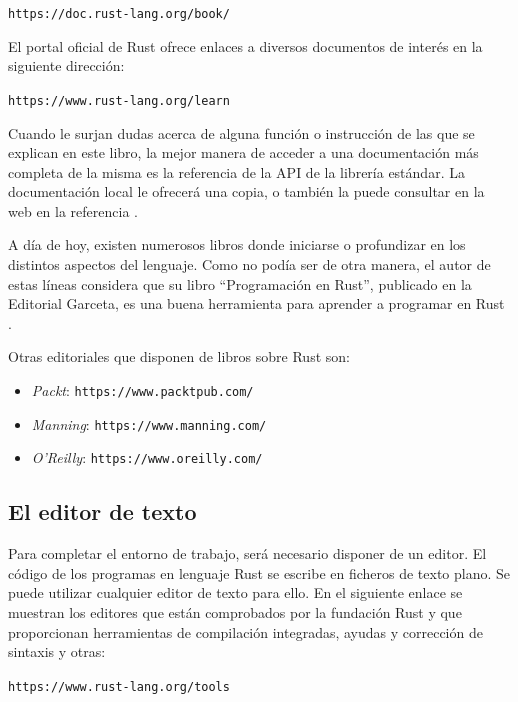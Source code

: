 {\centering \small \texttt{https://doc.rust-lang.org/book/} \par}

El portal oficial de Rust ofrece enlaces a diversos documentos de interés en la siguiente dirección:

{\centering \small \texttt{https://www.rust-lang.org/learn} \par}

Cuando le surjan dudas acerca de alguna función o instrucción de las que se explican en este libro, la mejor manera de acceder a una documentación más completa de la misma es la referencia de la API de la librería estándar. La documentación local le ofrecerá una copia, o también la puede 
consultar en la web en la referencia \citep{rustfoundationRustStandardLibrary}.

A día de hoy, existen numerosos libros donde iniciarse o profundizar en los distintos aspectos del lenguaje. Como no podía ser de otra manera, el autor de estas líneas considera que su libro ``Programación en Rust'', publicado en la Editorial Garceta, es una buena herramienta para aprender a programar en Rust \citep{higueradefrutosProgramacionRust2022}.

Otras editoriales que disponen de libros sobre Rust son:
\begin{itemize}
   \item \textit{Packt}: {\small \texttt{https://www.packtpub.com/}}
   \item \textit{Manning}: {\small \texttt{https://www.manning.com/}}
   \item \textit{O'Reilly}: {\small \texttt{https://www.oreilly.com/}}
\end{itemize}

\subsection{El editor de texto}

\noindent Para completar el entorno de trabajo, será necesario disponer de un editor. El código de los programas en lenguaje Rust se escribe en ficheros de texto plano. Se puede utilizar cualquier editor de texto para ello. En el siguiente enlace se muestran los editores que están comprobados por la fundación Rust y que proporcionan herramientas de compilación integradas, ayudas y corrección de sintaxis y otras:

{\centering \small \texttt{https://www.rust-lang.org/tools} \par}

